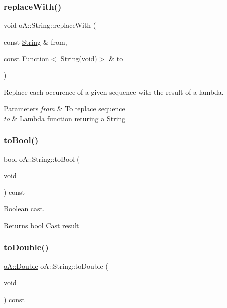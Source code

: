 \subsubsection{\texorpdfstring{replace\+With()}{replaceWith()}}
{\footnotesize\ttfamily void o\+A\+::\+String\+::replace\+With (\begin{DoxyParamCaption}\item[{const \mbox{\hyperlink{classo_a_1_1_string}{String}} \&}]{from,  }\item[{const \mbox{\hyperlink{namespaceo_a_a85bea86b9d05d2b86c77d8ee5b7bbde5}{Function}}$<$ \mbox{\hyperlink{classo_a_1_1_string}{String}}(void)$>$ \&}]{to }\end{DoxyParamCaption})}



Replace each occurence of a given sequence with the result of a lambda. 


\begin{DoxyParams}{Parameters}
{\em from} & To replace sequence \\
\hline
{\em to} & Lambda function returing a \mbox{\hyperlink{classo_a_1_1_string_a10ce41917f151b304f0b465c1ff1ec6e}{String}} \\
\hline
\end{DoxyParams}
\mbox{\label{classo_a_1_1_string_a838537de7617a227e77662090f25d5a9}} 
\subsubsection{\texorpdfstring{to\+Bool()}{toBool()}}
{\footnotesize\ttfamily bool o\+A\+::\+String\+::to\+Bool (\begin{DoxyParamCaption}\item[{void}]{ }\end{DoxyParamCaption}) const}



Boolean cast. 

\begin{DoxyReturn}{Returns}
bool Cast result 
\end{DoxyReturn}
\mbox{\label{classo_a_1_1_string_a609bc93f4fdb26cc79d26747741af787}} 
\subsubsection{\texorpdfstring{to\+Double()}{toDouble()}}
{\footnotesize\ttfamily \mbox{\hyperlink{namespaceo_a_a2bcc976232176d2dcf8b9df1fa33c038}{o\+A\+::\+Double}} o\+A\+::\+String\+::to\+Double (\begin{DoxyParamCaption}\item[{void}]{ }\end{DoxyParamCaption}) const}



